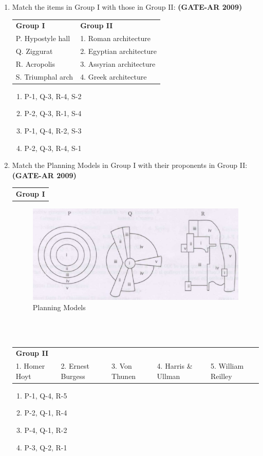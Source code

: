 \documentclass[a4paper,10pt]{article}
\begin{document}
\begin{enumerate}
    \item Match the items in Group I with those in Group II: \hfill \textbf{(GATE-AR 2009)} \\
    \begin{tabular}{ l l }
	\textbf{Group I} & \textbf{Group II} \\
	P. Hypostyle hall & 1. Roman architecture \\
	Q. Ziggurat & 2. Egyptian architecture \\
	R. Acropolis & 3. Assyrian architecture \\
	S. Triumphal arch & 4. Greek architecture \\
	\end{tabular}
	\begin{multicols}{2}
	\begin{enumerate}
        \item P-1, Q-3, R-4, S-2
        \item P-2, Q-3, R-1, S-4
        \item P-1, Q-4, R-2, S-3
        \item P-2, Q-3, R-4, S-1
    \end{enumerate}
	\end{multicols}

    \item Match the Planning Models in Group I with their proponents in Group II: \hfill \textbf{(GATE-AR 2009)} \\
    \begin{tabular}{ l }
	\textbf{Group I} \\
	\end{tabular}
	\begin{figure}[h!]
        \centering
        \includegraphics[width=0.5\linewidth]{figs/img_03.jpg}
	\caption{Planning Models}
	\label{fig:3}
    \end{figure} \\
     \\
    \begin{tabular}{ l l l l l }
	\textbf{Group II} & & \\
	1. Homer Hoyt & 2. Ernest Burgess & 3. Von Thunen & 4. Harris \& Ullman & 5. William Reilley \\
	\end{tabular}
	\begin{multicols}{2}
	\begin{enumerate}
        \item P-1, Q-4, R-5
        \item P-2, Q-1, R-4
        \item P-4, Q-1, R-2
        \item P-3, Q-2, R-1
    \end{enumerate}
	\end{multicols}


\end{enumerate}
\end{document}
